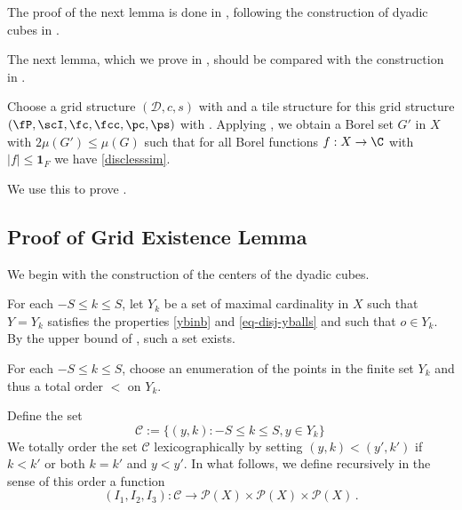 The proof of the next lemma is done in ,
following the construction of dyadic cubes in \cite[\S 3]{christ1990b}.





The next lemma, which we prove in , should be compared
with the construction in \cite[Lemma 2.12]{zk-polynomial}.


Choose a grid structure $(\mathcal{D}, c,s)$ with  and a tile structure for this
grid structure $(\fP,\scI,\fc,\fcc,\pc,\ps)$ with .
Applying , we obtain a Borel set $G'$ in $X$ with $2\mu(G')\leq \mu(G)$ such that for all Borel functions $f:X\to \C$ with $|f|\le \mathbf{1}_F$
we have \eqref{disclesssim}.



We use this to prove .



\subsection{Proof of Grid Existence Lemma}
\label{subsecdyadic}

We begin with the construction of the centers of the dyadic cubes.




For each $-S\le k\le S$, let $Y_k$ be a set of
maximal cardinality in $X$ such that $Y=Y_k$ satisfies
the properties \eqref{ybinb} and \eqref{eq-disj-yballs} and such that $o \in Y_k$.
By the upper bound of , such a set exists.

For each $-S\le k\le S$, choose an enumeration of the points in the finite set $Y_k$ and thus a total
order $<$ on $Y_{k}$.




Define the set
\begin{equation}
    \mathcal{C}:= \{(y,k): -S\le k\le S, y\in Y_k\}\,
\end{equation}
We totally order the set $\mathcal{C}$ lexicographically by setting
$(y,k)<(y',k')$ if $k< k'$ or both $k=k'$ and $y<y'$.
In what follows, we define recursively in the sense of this order a function
\begin{equation}
    (I_1,I_2,I_3): \mathcal{C}\to \mathcal{P}(X)\times \mathcal{P}(X)\times \mathcal{P}(X)\, .
\end{equation}


